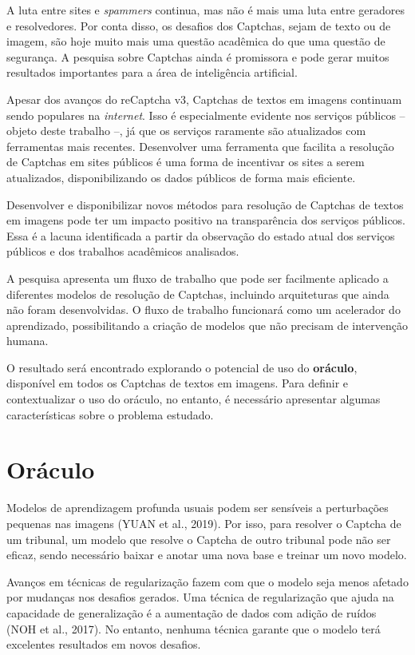 \documentclass[12pt,twoside,brazilian]{book}
\begin{document}
A luta entre sites e \emph{spammers} continua, mas não é mais uma luta
entre geradores e resolvedores. Por conta disso, os desafios dos
Captchas, sejam de texto ou de imagem, são hoje muito mais uma questão
acadêmica do que uma questão de segurança. A pesquisa sobre Captchas
ainda é promissora e pode gerar muitos resultados importantes para a
área de inteligência artificial.

Apesar dos avanços do reCaptcha v3, Captchas de textos em imagens
continuam sendo populares na \emph{internet}. Isso é especialmente
evidente nos serviços públicos -- objeto deste trabalho --, já que os
serviços raramente são atualizados com ferramentas mais recentes.
Desenvolver uma ferramenta que facilita a resolução de Captchas em sites
públicos é uma forma de incentivar os sites a serem atualizados,
disponibilizando os dados públicos de forma mais eficiente.

Desenvolver e disponibilizar novos métodos para resolução de Captchas de
textos em imagens pode ter um impacto positivo na transparência dos
serviços públicos. Essa é a lacuna identificada a partir da observação
do estado atual dos serviços públicos e dos trabalhos acadêmicos
analisados.

A pesquisa apresenta um fluxo de trabalho que pode ser facilmente
aplicado a diferentes modelos de resolução de Captchas, incluindo
arquiteturas que ainda não foram desenvolvidas. O fluxo de trabalho
funcionará como um acelerador do aprendizado, possibilitando a criação
de modelos que não precisam de intervenção humana.

O resultado será encontrado explorando o potencial de uso do
\textbf{oráculo}, disponível em todos os Captchas de textos em imagens.
Para definir e contextualizar o uso do oráculo, no entanto, é necessário
apresentar algumas características sobre o problema estudado.

\hypertarget{sec-intro-oraculo}{%
\section{Oráculo}\label{sec-intro-oraculo}}

Modelos de aprendizagem profunda usuais podem ser sensíveis a
perturbações pequenas nas imagens (YUAN et al., 2019). Por isso, para
resolver o Captcha de um tribunal, um modelo que resolve o Captcha de
outro tribunal pode não ser eficaz, sendo necessário baixar e anotar uma
nova base e treinar um novo modelo.

Avanços em técnicas de regularização fazem com que o modelo seja menos
afetado por mudanças nos desafios gerados. Uma técnica de regularização
que ajuda na capacidade de generalização é a aumentação de dados com
adição de ruídos (NOH et al., 2017). No entanto, nenhuma técnica garante
que o modelo terá excelentes resultados em novos desafios.
\end{document}
